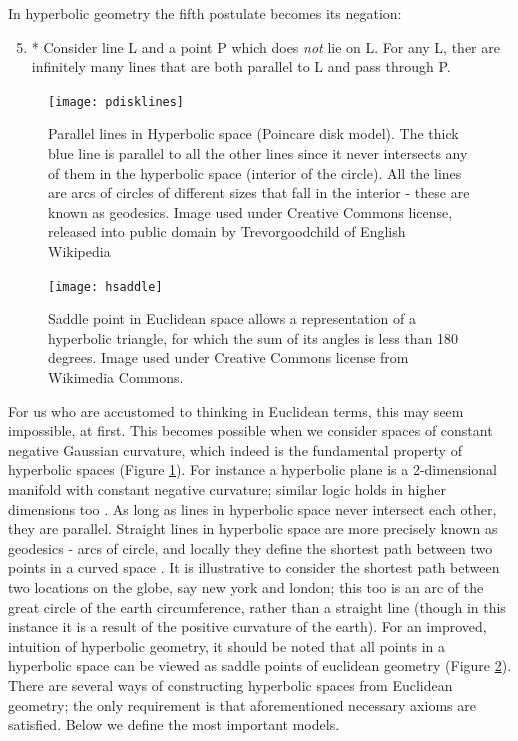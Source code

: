 \documentclass[12pt]{report}
\begin{document}
In hyperbolic geometry the fifth postulate becomes its negation: 

\begin{enumerate}
   \setcounter{enumi}{4}
   \item * Consider line L and a point P which does \textit{not} lie on L. For any L, ther are infinitely many lines that are both parallel to L and pass through P.
 \end{enumerate}

\begin{figure}
  \centering
	\texttt{[image: pdisklines]}
	\caption{Parallel lines in Hyperbolic space (Poincare disk model). The thick blue line is parallel to all the other lines since it never intersects any of them in the hyperbolic space (interior of the circle). All the lines are arcs of circles of different sizes that fall in the interior - these are known as geodesics. Image used under Creative Commons license, released into public domain by Trevorgoodchild of English Wikipedia}
	\label{fig:disklines}
\end{figure}

\begin{figure}
  \centering
	\texttt{[image: hsaddle]}
	\caption{Saddle point in Euclidean space allows a representation of a hyperbolic triangle, for which the sum of its angles is less than 180 degrees. Image used under Creative Commons license from Wikimedia Commons.}
	\label{fig:hsaddle}
\end{figure}

For us who are accustomed to thinking in Euclidean terms, this may seem impossible, at first. This becomes possible when we consider spaces of constant negative Gaussian curvature, which indeed is the fundamental property of hyperbolic spaces (Figure \ref{fig:disklines}). For instance a hyperbolic plane is a 2-dimensional manifold with constant negative curvature; similar logic holds in higher dimensions too \cite{Stillwell1991}. As long as lines in hyperbolic space never intersect each other, they are parallel. Straight lines in hyperbolic space are more precisely known as geodesics - arcs of circle, and locally they define the shortest path between two points in a curved space \cite{Stillwell1991}. It is illustrative to consider the shortest path between two locations on the globe, say new york and london; this too is an arc of the great circle of the earth circumference, rather than a straight line (though in this instance it is a result of the positive curvature of the earth). For an improved, intuition of hyperbolic geometry, it should be noted that all points in a hyperbolic space can be viewed as saddle points of euclidean geometry (Figure \ref{fig:hsaddle}). There are several ways of constructing hyperbolic spaces from Euclidean geometry; the only requirement is that aforementioned necessary axioms are satisfied. Below we define the most important models.
\end{document}
